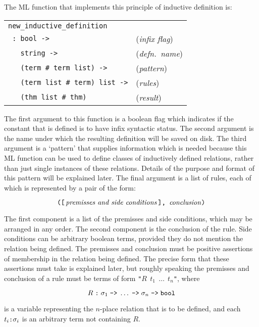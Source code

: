 The {\small ML} function that implements this principle of inductive definition
is:

\medskip

\noindent\begin{tabular}{@{\hskip\mathindent}l@{\hskip4.6mm}l@{}}
\verb!new_inductive_definition! & \mbox{} \\
\verb! : bool ->! & ({\it infix flag\/})\\
\verb!   string ->! & ({\it defn.\ name\/})\\
\verb!   (term # term list) ->! & ({\it pattern\/})\\
\verb!   (term list # term) list ->! & ({\it rules\/})\\
\verb!   (thm list # thm)! & ({\it result\/})
\end{tabular}

\medskip

\noindent The first argument to this function is a boolean flag which indicates
if the constant that is defined is to have infix syntactic status.  The second
argument is the name under which the resulting definition will be saved on
disk.  The third argument is a `pattern' that supplies information which is
needed because this {\small ML} function can be used to define classes of
inductively defined relations, rather than just single instances of these
relations. Details of the purpose and format of this pattern will be explained
later.  The final argument is a list of rules, each of which is represented by
a pair of the form:

\[ \hbox{\verb!([!}\,
\hbox{\it premisses and side conditions\/}\,\hbox{\verb!], !}
 \hbox{\it conclusion\/}\hbox{\verb!)!} \]

\noindent The first component is a list of the premisses and side conditions,
which may be arranged in any order.  The second component is the conclusion of
the rule.  Side conditions can be arbitrary boolean terms, provided they do not
mention the relation being defined.  The premisses and conclusion must be
positive assertions of membership in the relation being defined.  The precise
form that these assertions must take is explained later, but roughly speaking
the premisses and conclusion of a rule must be terms of form
\verb!"!$R\;\,t_1\;\,\dots\;\,t_n$\verb!"!, where

\[ R\; \hbox{\verb!:!}\; \sigma_1 \;\hbox{\verb!->!}\; \dots
\;\hbox{\verb!->!}\; \sigma_n \;\hbox{\verb!->!}\; \hbox{\verb!bool!}\]

\noindent is a variable representing the $n$-place relation that is to be
defined, and each $t_i \hbox{\verb!:!} \sigma_i$ is an arbitrary term not
containing $R$.

